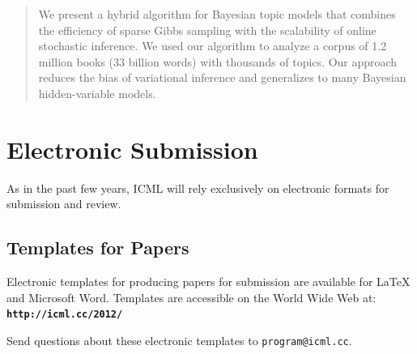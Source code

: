 \documentclass{article}
\begin{document}

\begin{abstract}
We present a hybrid algorithm for Bayesian
topic models that combines the efficiency of
sparse Gibbs sampling with the scalability of
online stochastic inference. We used our algorithm to analyze a corpus of 1.2 million books
(33 billion words) with thousands of topics.
Our approach reduces the bias of variational
inference and generalizes to many Bayesian
hidden-variable models.
\end{abstract}

\section{Electronic Submission}
\label{submission}

As in the past few years, ICML will rely exclusively on
electronic formats for submission and review.


\subsection{Templates for Papers}

Electronic templates for producing papers for submission are available
for \LaTeX\/ and Microsoft Word. Templates are accessible on the World
Wide Web at:\\
\textbf{\texttt{http://icml.cc/2012/}}

\noindent
Send questions about these electronic templates to
\texttt{program@icml.cc}.
\end{document}
